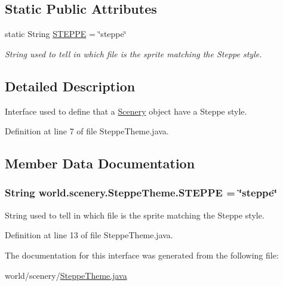 \subsection*{Static Public Attributes}
\begin{DoxyCompactItemize}
\item 
static String \hyperlink{interfaceworld_1_1scenery_1_1_steppe_theme_a03bdfdc54a3a5d52694b77342ec34e3e}{S\-T\-E\-P\-P\-E} = \char`\"{}steppe\char`\"{}
\begin{DoxyCompactList}\small\item\em String used to tell in which file is the sprite matching the Steppe style. \end{DoxyCompactList}\end{DoxyCompactItemize}


\subsection{Detailed Description}
Interface used to define that a \hyperlink{classworld_1_1scenery_1_1_scenery}{Scenery} object have a Steppe style. 

Definition at line 7 of file Steppe\-Theme.\-java.



\subsection{Member Data Documentation}
\hypertarget{interfaceworld_1_1scenery_1_1_steppe_theme_a03bdfdc54a3a5d52694b77342ec34e3e}{
\subsubsection[{S\-T\-E\-P\-P\-E}]{\setlength{\rightskip}{0pt plus 5cm}String world.\-scenery.\-Steppe\-Theme.\-S\-T\-E\-P\-P\-E = \char`\"{}steppe\char`\"{}\hspace{0.3cm}{\ttfamily [static]}}}\label{interfaceworld_1_1scenery_1_1_steppe_theme_a03bdfdc54a3a5d52694b77342ec34e3e}


String used to tell in which file is the sprite matching the Steppe style. 



Definition at line 13 of file Steppe\-Theme.\-java.



The documentation for this interface was generated from the following file\-:\begin{DoxyCompactItemize}
\item 
world/scenery/\hyperlink{_steppe_theme_8java}{Steppe\-Theme.\-java}\end{DoxyCompactItemize}
